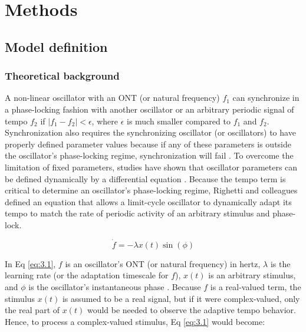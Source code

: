 \documentclass{report}
\begin{document}
\section{Methods}

\subsection{Model definition}

\subsubsection{Theoretical background}

A non-linear oscillator with an ONT (or natural frequency) $f_1$ can synchronize in a phase-locking fashion with another oscillator or an arbitrary periodic signal of tempo $f_2$ if $|f_1 − f_2| < \epsilon$, where $\epsilon$ is much smaller compared to $f_1$ and $f_2$. Synchronization also requires the synchronizing oscillator (or oscillators) to have properly defined parameter values because if any of these parameters is outside the oscillator's phase-locking regime, synchronization will fail \cite{righetti2006dynamic}. To overcome the limitation of fixed parameters, studies have shown that oscillator parameters can be defined dynamically by a differential equation \cite{acebron1998adaptive, borisyuk2001oscillatory, ermentrout1991adaptive, nakanishi2003learning, nishii1999learning, righetti2006dynamic}. Because the tempo term is critical to determine an oscillator's phase-locking regime, Righetti and colleagues \cite{righetti2006dynamic} defined an equation that allows a limit-cycle oscillator to dynamically adapt its tempo to match the rate of periodic activity of an arbitrary stimulus and phase-lock.

\begin{equation}
\dot{f} = -\lambda x(t) \sin(\phi) \label{eq:3.1}
\end{equation}

In Eq \eqref{eq:3.1}, $f$ is an oscillator's ONT (or natural frequency) in hertz, $\lambda$ is the learning rate (or the adaptation timescale for $f$), $x(t)$ is an arbitrary stimulus, and $\phi$ is the oscillator's instantaneous phase \cite{righetti2006dynamic}. Because $f$ is a real-valued term, the stimulus $x(t)$ is assumed to be a real signal, but if it were complex-valued, only the real part of $x(t)$ would be needed to observe the adaptive tempo behavior. Hence, to process a complex-valued stimulus, Eq \eqref{eq:3.1} would become:
\end{document}
